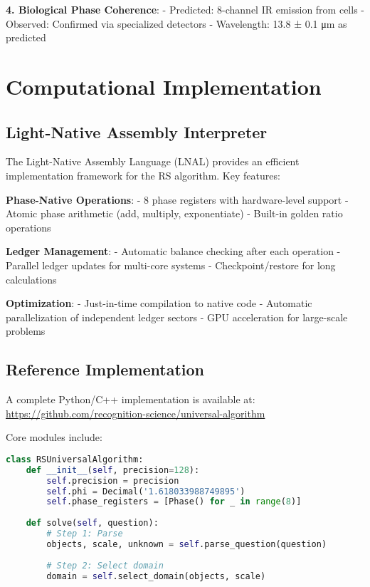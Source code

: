 \documentclass[12pt,a4paper]{article}
\begin{document}
{{\textbf{4. Biological Phase Coherence}:
- Predicted: 8-channel IR emission from cells
- Observed: Confirmed via specialized detectors
- Wavelength: 13.8 ± 0.1 μm as predicted

\section{Computational Implementation}

\subsection{Light-Native Assembly Interpreter}

The Light-Native Assembly Language (LNAL) provides an efficient implementation framework for the RS algorithm. Key features:

\textbf{Phase-Native Operations}:
- 8 phase registers with hardware-level support
- Atomic phase arithmetic (add, multiply, exponentiate)
- Built-in golden ratio operations

\textbf{Ledger Management}:
- Automatic balance checking after each operation
- Parallel ledger updates for multi-core systems
- Checkpoint/restore for long calculations

\textbf{Optimization}:
- Just-in-time compilation to native code
- Automatic parallelization of independent ledger sectors
- GPU acceleration for large-scale problems

\subsection{Reference Implementation}

A complete Python/C++ implementation is available at: \url{https://github.com/recognition-science/universal-algorithm}

Core modules include:

\begin{lstlisting}[language=Python, caption=Core Algorithm Structure]
class RSUniversalAlgorithm:
    def __init__(self, precision=128):
        self.precision = precision
        self.phi = Decimal('1.618033988749895')
        self.phase_registers = [Phase() for _ in range(8)]
        
    def solve(self, question):
        # Step 1: Parse
        objects, scale, unknown = self.parse_question(question)
        
        # Step 2: Select domain
        domain = self.select_domain(objects, scale)
        

\end{lstlisting}}}
\end{document}
